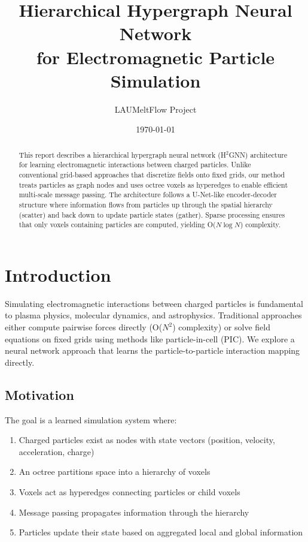 \documentclass[11pt,a4paper]{article}
\title{Hierarchical Hypergraph Neural Network\\for Electromagnetic Particle Simulation}
\author{LAUMeltFlow Project}
\date{\today}
\begin{document}
\maketitle

\begin{abstract}
This report describes a hierarchical hypergraph neural network (H$^2$GNN) architecture for learning electromagnetic interactions between charged particles. Unlike conventional grid-based approaches that discretize fields onto fixed grids, our method treats particles as graph nodes and uses octree voxels as hyperedges to enable efficient multi-scale message passing. The architecture follows a U-Net-like encoder-decoder structure where information flows from particles up through the spatial hierarchy (scatter) and back down to update particle states (gather). Sparse processing ensures that only voxels containing particles are computed, yielding O($N \log N$) complexity.
\end{abstract}

\section{Introduction}

Simulating electromagnetic interactions between charged particles is fundamental to plasma physics, molecular dynamics, and astrophysics. Traditional approaches either compute pairwise forces directly (O($N^2$) complexity) or solve field equations on fixed grids using methods like particle-in-cell (PIC). We explore a neural network approach that learns the particle-to-particle interaction mapping directly.

\subsection{Motivation}

The goal is a learned simulation system where:
\begin{enumerate}
    \item Charged particles exist as nodes with state vectors (position, velocity, acceleration, charge)
    \item An octree partitions space into a hierarchy of voxels
    \item Voxels act as hyperedges connecting particles or child voxels
    \item Message passing propagates information through the hierarchy
    \item Particles update their state based on aggregated local and global information
\end{enumerate}
\end{document}
